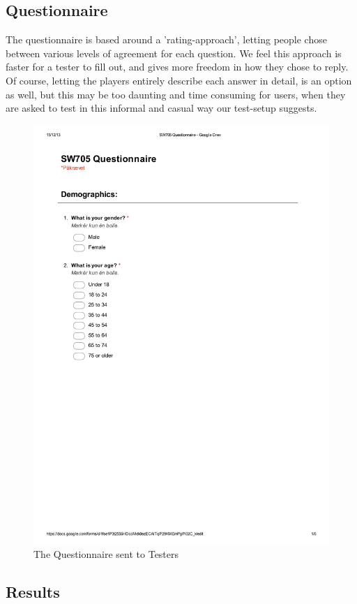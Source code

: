 \subsection{Questionnaire}

The questionnaire is based around a 'rating-approach', letting people chose between various levels of agreement for each question. We feel this approach is faster for a tester to fill out, and gives more freedom in how they chose to reply. Of course, letting the players entirely describe each answer in detail, is an option as well, but this may be too daunting and time consuming for users, when they are asked to test in this informal and casual way our test-setup suggests.

\begin{figure}[h]
	\centering
		\includegraphics{bib/pdf/SW705 Questionnaire.pdf}
	\caption{The Questionnaire sent to Testers}
	\label{fig:SW705 Questionnaire}
\end{figure}




\subsection{Results}